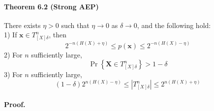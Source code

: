 \documentclass[8pt]{article}
\begin{document}
\begin{tcolorbox}
\paragraph{Theorem 6.2 (Strong AEP)} There exists $\eta>0$ such that $\eta \rightarrow 0$ as $\delta \rightarrow 0$, and the following hold:\\
1) If $\mathbf{x} \in T_{[X] \delta}^{n}$, then
$$
2^{-n(H(X)+\eta)} \leq p(\mathbf{x}) \leq 2^{-n(H(X)-\eta)}
$$
2) For $n$ sufficiently large,
$$
\operatorname{Pr}\left\{\mathbf{X} \in T_{[X] \delta}^{n}\right\}>1-\delta
$$
3) For $n$ sufficiently large,
$$
(1-\delta) 2^{n(H(X)-\eta)} \leq\left|T_{[X] \delta}^{n}\right| \leq 2^{n(H(X)+\eta)}
$$
\end{tcolorbox}

\paragraph{Proof.} 
\end{document}
